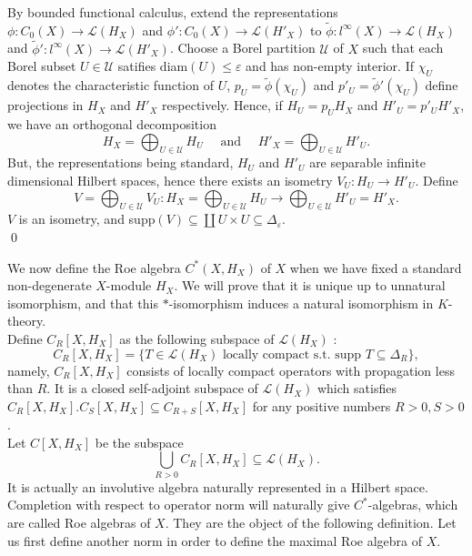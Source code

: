 \begin{dem}
By bounded functional calculus, extend the representations $\phi : C_0(X)\rightarrow \mathcal L(H_X)$ and $\phi' : C_0(X)\rightarrow \mathcal L(H'_X)$ to $\tilde \phi : l^\infty(X)\rightarrow \mathcal L(H_X) $ and $\tilde \phi' : l^\infty(X)\rightarrow \mathcal L(H'_X) $. Choose a Borel partition $\mathcal U$ of $X$ such that each Borel subset $U\in\mathcal U$ satifies diam$(U)\leq \varepsilon $ and has non-empty interior. If $\chi_U$ denotes the characteristic function of $U$, $p_U = \tilde\phi(\chi_U)$ and $p'_{U}=\tilde\phi'(\chi_U)$ define projections in $H_X$ and $H'_X$ respectively. Hence, if $H_U = p_U H_X$ and $H'_U= p'_U H'_X$, we have an orthogonal decomposition 
\[H_X = \bigoplus_{U\in\mathcal U} H_U \quad  \text{ and } \quad H'_X = \bigoplus_{U\in\mathcal U} H'_U.\]
But, the representations being standard, $H_U$ and $H'_U$ are separable infinite dimensional Hilbert spaces, hence there exists an isometry $V_U : H_U\rightarrow H'_U$. Define 
\[V = \bigoplus_{U\in\mathcal U} V_U : H_X = \bigoplus_{U\in\mathcal U} H_U \rightarrow  \bigoplus_{U\in\mathcal U} H'_U = H'_X.  \]
$V$ is an isometry, and supp$(V)\subseteq \coprod U\times U \subseteq \Delta_\varepsilon$.\\
\qed
\end{dem}


We now define the Roe algebra $C^*(X, H_X)$ of $X$ when we have fixed a standard non-degenerate $X$-module $H_X$. We will prove that it is unique up to unnatural isomorphism, and that this $*$-isomorphism induces a natural isomorphism in $K$-theory.\\

Define $C_R[X,H_X]$ as the following subspace of $\mathcal L(H_X)$ :
\[C_R[X,H_X] = \{T\in \mathcal L(H_X) \text{ locally compact  s.t. supp }T\subseteq \Delta_R \},\]
namely, $C_R[X,H_X]$ consists of locally compact operators with propagation less than $R$. It is a closed self-adjoint subspace of $\mathcal L(H_X)$ which satisfies $C_R[X,H_X].C_S[X,H_X]\subseteq C_{R+S}[X,H_X]$ for any positive numbers $R>0,S>0$.\\

Let $C[X,H_X]$ be the subspace 
\[\bigcup_{R>0} C_R[X,H_X]\subseteq \mathcal L(H_X).\] 
It is actually an involutive algebra naturally represented in a Hilbert space. Completion with respect to operator norm will naturally give $C^*$-algebras, which are called Roe algebras of $X$. They are the object of the following definition. Let us first define another norm in order to define the maximal Roe algebra of $X$.\\

